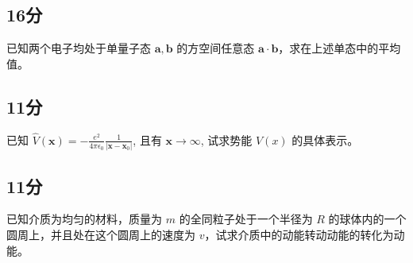 \subsection{16分}
已知两个电子均处于单量子态 $\mathbf{a}, \mathbf{b}$ 的方空间任意态 $\mathbf{a} \cdot \mathbf{b}$，求在上述单态中的平均值。

\subsection{11分}
已知 $\hat{V}(\mathbf{x}) = -\frac{e^2}{4 \pi \epsilon_0} \frac{1}{|\mathbf{x} - \mathbf{x}_0|}$, 且有 $\mathbf{x} \rightarrow \infty$, 试求势能 $V(x)$ 的具体表示。

\subsection{11分}
已知介质为均匀的材料，质量为 $m$ 的全同粒子处于一个半径为 $R$ 的球体内的一个圆周上，并且处在这个圆周上的速度为 $v$，试求介质中的动能转动动能的转化为动能。

